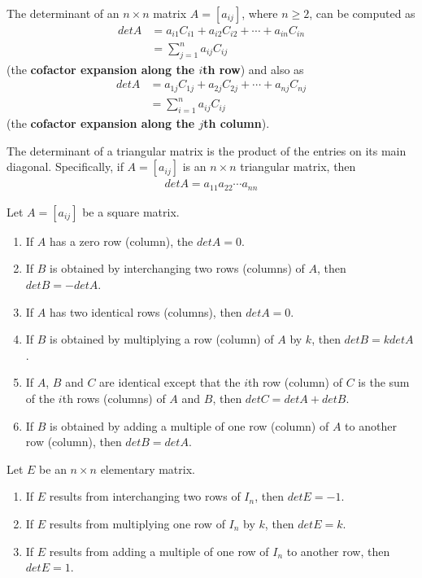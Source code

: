 \documentclass{article}
\begin{document}
\begin{theorem}
    The determinant of an $n\times n$ matrix $A=[a_{ij}]$, where $n\geq 2$, can be computed as
    \begin{align*}
        det A & = a_{i1}C_{i1}+a_{i2}C_{i2} + \cdots + a_{in}C_{in} \\
              & = \sum_{j=1}^n a_{ij}C_{ij}
    \end{align*}
    (the \textbf{cofactor expansion along the $i$th row}) and also as
    \begin{align*}
        det A & = a_{1j}C_{1j}+a_{2j}C_{2j} + \cdots + a_{nj}C_{nj} \\
              & = \sum_{i=1}^n a_{ij}C_{ij}
    \end{align*}
    (the \textbf{cofactor expansion along the $j$th column}).
\end{theorem}
\begin{theorem}
    The determinant of a triangular matrix is the product of the entries on its main diagonal.
    Specifically, if $A=[a_{ij}]$ is an $n\times n$ triangular matrix, then
    \begin{align*}
        det A = a_{11}a_{22}\cdots a_{nn}
    \end{align*}
\end{theorem}
\begin{theorem}
    Let $A=[a_{ij}]$ be a square matrix.
    \begin{enumerate}
        \item If $A$ has a zero row (column), the $det A = 0$.
        \item If $B$ is obtained by interchanging two rows (columns) of $A$, then $det B = -det A$.
        \item If $A$ has two identical rows (columns), then $det A = 0$.
        \item If $B$ is obtained by multiplying a row (column) of $A$ by $k$, then $det B = k det A$.
        \item If $A$, $B$ and $C$ are identical except that the $i$th row (column) of $C$ is the sum of the $i$th rows (columns) of $A$ and $B$, then $det C = det A + det B$.
        \item If $B$ is obtained by adding a multiple of one row (column) of $A$ to another row (column), then $det B = det A$.
    \end{enumerate}
\end{theorem}
\begin{theorem}
    Let $E$ be an $n\times n$ elementary matrix.
    \begin{enumerate}
        \item If $E$ results from interchanging two rows of $I_n$, then $det E = -1$.
        \item If $E$ results from multiplying one row of $I_n$ by $k$, then $det E = k$.
        \item If $E$ results from adding a multiple of one row of $I_n$ to another row, then $det E = 1$.
    \end{enumerate}
\end{theorem}
\end{document}
